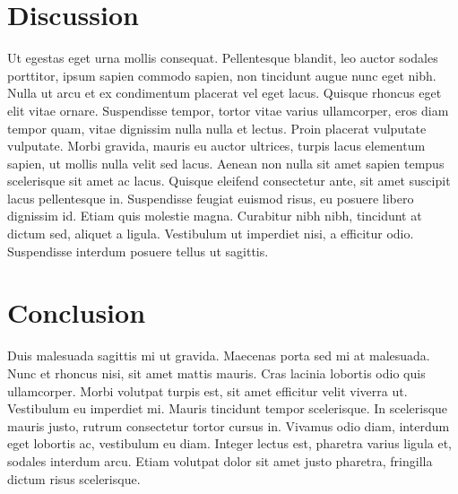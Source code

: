 \documentclass[a4paper, 10pt]{article}
\begin{document}
\begin{multicols}{2}





\section{Discussion}
Ut egestas eget urna mollis consequat. Pellentesque blandit, leo auctor sodales porttitor, ipsum sapien commodo sapien, non tincidunt augue nunc eget nibh. Nulla ut arcu et ex condimentum placerat vel eget lacus. Quisque rhoncus eget elit vitae ornare. Suspendisse tempor, tortor vitae varius ullamcorper, eros diam tempor quam, vitae dignissim nulla nulla et lectus. Proin placerat vulputate vulputate. Morbi gravida, mauris eu auctor ultrices, turpis lacus elementum sapien, ut mollis nulla velit sed lacus. Aenean non nulla sit amet sapien tempus scelerisque sit amet ac lacus. Quisque eleifend consectetur ante, sit amet suscipit lacus pellentesque in. Suspendisse feugiat euismod risus, eu posuere libero dignissim id. Etiam quis molestie magna. Curabitur nibh nibh, tincidunt at dictum sed, aliquet a ligula. Vestibulum ut imperdiet nisi, a efficitur odio. Suspendisse interdum posuere tellus ut sagittis.

\section{Conclusion}
Duis malesuada sagittis mi ut gravida. Maecenas porta sed mi at malesuada. Nunc et rhoncus nisi, sit amet mattis mauris. Cras lacinia lobortis odio quis ullamcorper. Morbi volutpat turpis est, sit amet efficitur velit viverra ut. Vestibulum eu imperdiet mi. Mauris tincidunt tempor scelerisque. In scelerisque mauris justo, rutrum consectetur tortor cursus in. Vivamus odio diam, interdum eget lobortis ac, vestibulum eu diam. Integer lectus est, pharetra varius ligula et, sodales interdum arcu. Etiam volutpat dolor sit amet justo pharetra, fringilla dictum risus scelerisque.
\end{multicols}
\end{document}

